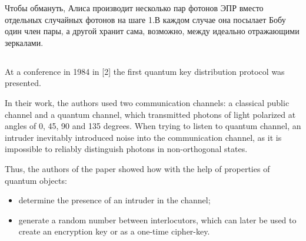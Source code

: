 ­­­Чтобы обмануть, Алиса производит несколько пар фотонов ЭПР вместо отдельных случайных фотонов на шаге 1.В каждом случае она посылает Бобу один член пары, а другой хранит сама, возможно, между идеально отражающими зеркалами.

\subsection{\review}

At a conference in 1984 in [2] the first quantum key distribution protocol was presented.

In their work, the authors used two communication channels: a classical public channel and a quantum channel, which transmitted photons of light polarized at angles of 0, 45, 90 and 135 degrees. When trying to listen to quantum channel, an intruder inevitably introduced noise into the communication channel, as it is impossible to reliably distinguish photons in non-orthogonal states.

Thus, the authors of the paper showed how with the help of properties of quantum objects:
\begin{itemize}
	\item determine the presence of an intruder in the channel;
	\item generate a random number between interlocutors, which can later be used to create an encryption key or as a one-time cipher-key.
\end{itemize}



\subsection{\dic}
